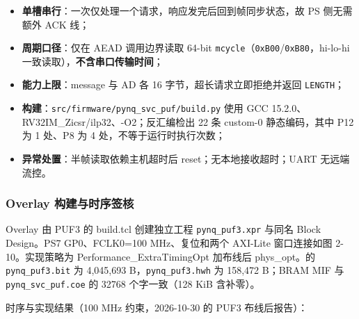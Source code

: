 \begin{itemize}
\tightlist
\item
  \textbf{单槽串行}：一次仅处理一个请求，响应发完后回到帧同步状态，故 PS 侧无需额外 ACK 线；
\item
  \textbf{周期口径}：仅在 AEAD 调用边界读取 64-bit \texttt{mcycle}（\texttt{0xB00}/\texttt{0xB80}，hi-lo-hi 一致读取），\textbf{不含串口传输时间}；
\item
  \textbf{能力上限}：message 与 AD 各 16 字节，超长请求立即拒绝并返回 \texttt{LENGTH}；
\item
  \textbf{构建}：\texttt{src/firmware/pynq\_svc\_puf/build.py} 使用 GCC 15.2.0、RV32IM\_Zicsr/ilp32、-O2；反汇编检出 22 条 custom-0 静态编码，其中 P12 为 1 处、P8 为 4 处，不等于运行时执行次数；
\item
  \textbf{异常处置}：半帧读取依赖主机超时后 reset；无本地接收超时；UART 无远端流控。
\end{itemize}


\Needspace{85pt}

\subsubsection{Overlay 构建与时序签核}\label{overlay-ux6784ux5efaux4e0eux65f6ux5e8fux7b7eux6838}

Overlay 由 PUF3 的 build.tcl 创建独立工程 \texttt{pynq\_puf3.xpr} 与同名 Block Design。PS7 GP0、FCLK0=100 MHz、复位和两个 AXI-Lite 窗口连接如图 2-10。实现策略为 Performance\_ExtraTimingOpt 加布线后 phys\_opt。\pufcandidate 的 \texttt{pynq\_puf3.bit} 为 4,045,693 B，\texttt{pynq\_puf3.hwh} 为 158,472 B；BRAM MIF 与 \texttt{pynq\_svc\_puf.coe} 的 32768 个字一致（128 KiB 含补零）。


时序与实现结果（100 MHz 约束，2026-10-30 的 PUF3 布线后报告）：

